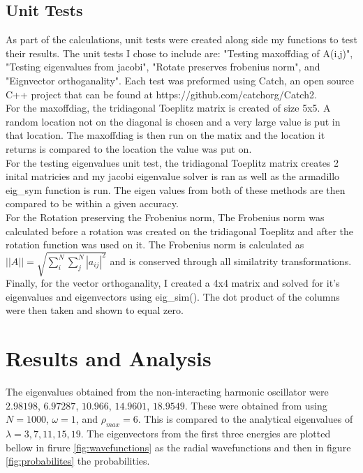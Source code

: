 \documentclass[%
 reprint,
 amsmath,amssymb,
 aps,
]{revtex4-1}
\begin{document}
\subsection{Unit Tests}
As part of the calculations, unit tests were created along side my functions to test their results. The unit tests I chose to include are: "Testing maxoffdiag of A(i,j)", "Testing eigenvalues from jacobi", "Rotate preserves frobenius norm", and "Eignvector orthoganality". Each test was preformed using Catch, an open source C++ project that can be found at https://github.com/catchorg/Catch2. \\

For the maxoffdiag, the tridiagonal Toeplitz matrix is created of size 5x5. A random location not on the diagonal is chosen and a very large value is put in that location. The maxoffdiag is then run on the matix and the location it returns is compared to the location the value was put on. \\

For the testing eigenvalues unit test, the tridiagonal Toeplitz matrix creates 2 inital matricies and my jacobi eigenvalue solver is ran as well as the armadillo eig\_sym function is run. The eigen values from both of these methods are then compared to be within a given accuracy.\\

For the Rotation preserving the Frobenius norm, The Frobenius norm was calculated before a rotation was created on the tridiagonal Toeplitz and after the rotation function was used on it. The Frobenius norm is calculated as $||A|| = \sqrt{\sum_i^N\sum_j^N |a_{ij}|^2}$ and is conserved through all similatrity transformations. \\

Finally, for the vector orthoganality, I created a 4x4 matrix and solved for it's eigenvalues and eigenvectors using eig\_sim(). The dot product of the columns were then taken and shown to equal zero. 


\section{\label{sec:level1}Results and Analysis}


The eigenvalues obtained from the non-interacting harmonic oscillator were $2.98198$, $6.97287$, $10.966$, $14.9601$, $18.9549$. These were obtained from using $N=1000$, $\omega = 1$, and $\rho_{max} = 6$. This is compared to the analytical eigenvalues of $\lambda = 3,7,11,15,19$. The eigenvectors from the first three energies are plotted bellow in firure \ref{fig:wavefunctions} as the radial wavefunctions and then in figure \ref{fig:probabilites} the probabilities.\\
\end{document}
